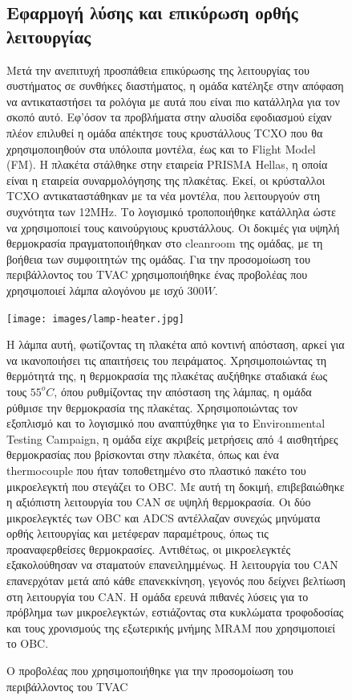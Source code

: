 \documentclass[a4paper,nobib,justified]{tufte-book}
\begin{document}
\begin{figure}
\subsection{Εφαρμογή λύσης και επικύρωση ορθής λειτουργίας}
Μετά την ανεπιτυχή προσπάθεια επικύρωσης της λειτουργίας του συστήματος σε συνθήκες διαστήματος, η ομάδα κατέληξε στην απόφαση να αντικαταστήσει τα ρολόγια με αυτά που είναι πιο κατάλληλα για τον σκοπό αυτό. Εφ'όσον τα προβλήματα στην αλυσίδα εφοδιασμού είχαν πλέον επιλυθεί η ομάδα απέκτησε τους κρυστάλλους TCXO που θα χρησιμοποιηθούν στα υπόλοιπα μοντέλα, έως και το Flight Model (FM). Η πλακέτα στάλθηκε στην εταιρεία PRISMA Hellas, η οποία είναι η εταιρεία συναρμολόγησης της πλακέτας. Εκεί, οι κρύσταλλοι TCXO αντικαταστάθηκαν με τα νέα μοντέλα, που λειτουργούν στη συχνότητα των 12MHz. Το λογισμικό τροποποιήθηκε κατάλληλα ώστε να χρησιμοποιεί τους καινούργιους κρυστάλλους. Οι δοκιμές για υψηλή θερμοκρασία πραγματοποιήθηκαν στο cleanroom της ομάδας, με τη βοήθεια των συμφοιτητών της ομάδας. Για την προσομοίωση του περιβάλλοντος του TVAC χρησιμοποιήθηκε ένας προβολέας που χρησιμοποιεί λάμπα αλογόνου με ισχύ $300W$.

\begin{marginfigure}
	\texttt{[image: images/lamp-heater.jpg]}
	\label{fig:lamp-heater}
	\caption{Ο προβολέας που χρησιμοποιήθηκε για την προσομοίωση του περιβάλλοντος του TVAC}
\end{marginfigure}
Η λάμπα αυτή, φωτίζοντας τη πλακέτα από κοντινή απόσταση, αρκεί για να ικανοποιήσει τις απαιτήσεις του πειράματος. Χρησιμοποιώντας τη θερμότητά της, η θερμοκρασία της πλακέτας αυξήθηκε σταδιακά έως τους $55^o C$, όπου ρυθμίζοντας την απόσταση της λάμπας, η ομάδα ρύθμισε την θερμοκρασία της πλακέτας. Χρησιμοποιώντας τον εξοπλισμό και το λογισμικό που αναπτύχθηκε για το Environmental Testing Campaign, η ομάδα είχε ακριβείς μετρήσεις από 4 αισθητήρες θερμοκρασίας που βρίσκονται στην πλακέτα, όπως και ένα thermocouple που ήταν τοποθετημένο στο πλαστικό πακέτο του μικροελεγκτή που στεγάζει το OBC. Με αυτή τη δοκιμή, επιβεβαιώθηκε η αξιόπιστη λειτουργία του CAN σε υψηλή θερμοκρασία. Οι δύο μικροελεγκτές των OBC και ADCS αντέλλαζαν συνεχώς μηνύματα ορθής λειτουργίας και μετέφεραν παραμέτρους, όπως τις προαναφερθείσες θερμοκρασίες. Αντιθέτως, οι μικροελεγκτές εξακολούθησαν να σταματούν επανειλημμένως. Η λειτουργία του CAN επανερχόταν μετά από κάθε επανεκκίνηση, γεγονός που δείχνει βελτίωση στη λειτουργία του CAN. Η ομάδα ερευνά πιθανές λύσεις για το πρόβλημα των μικροελεγκτών, εστιάζοντας στα κυκλώματα τροφοδοσίας και τους χρονισμούς της εξωτερικής μνήμης MRAM που χρησιμοποιεί το OBC.


\end{figure}
\end{document}
